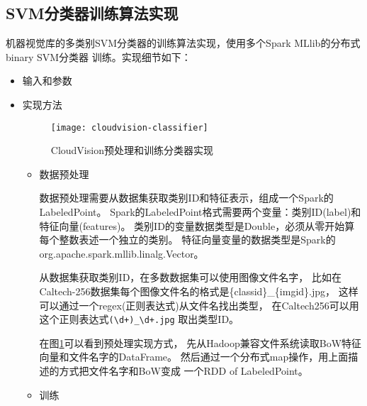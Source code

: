 \subsection{SVM分类器训练算法实现}
\label{subsec:classifier-training}
机器视觉库的多类别SVM分类器的训练算法实现，使用多个Spark MLlib的分布式binary SVM分类器
训练。实现细节如下：
\begin{itemize}
  \item 输入和参数
  \item 实现方法

        \begin{figure}[h]
          \centering
            \texttt{[image: cloudvision-classifier]}
          \caption{CloudVision预处理和训练分类器实现}
          \label{fig:cloudvision-classifier}
        \end{figure}


        \begin{itemize}
    
            \item 数据预处理

            数据预处理需要从数据集获取类别ID和特征表示，组成一个Spark的LabeledPoint。
            Spark的LabeledPoint格式需要两个变量：类别ID(label)和特征向量(features)。
            类别ID的变量数据类型是Double，必须从零开始算每个整数表述一个独立的类别。
            特征向量变量的数据类型是Spark的org.apache.spark.mllib.linalg.Vector。

            从数据集获取类别ID，在多数数据集可以使用图像文件名字，
            比如在Caltech-256数据集每个图像文件名的格式是\{classid\}\_\{imgid\}.jpg，
            这样可以通过一个regex(正则表达式)从文件名找出类型，
            在Caltech256可以用这个正则表达式\verb|(\d+)_\d+.jpg|
            取出类型ID。

            在图\ref{fig:cloudvision-classifier}可以看到预处理实现方式，
            先从Hadoop兼容文件系统读取BoW特征向量和文件名字的DataFrame。
            然后通过一个分布式map操作，用上面描述的方式把文件名字和BoW变成
            一个RDD of LabeledPoint。


            \item 训练



\end{itemize}
\end{itemize}
